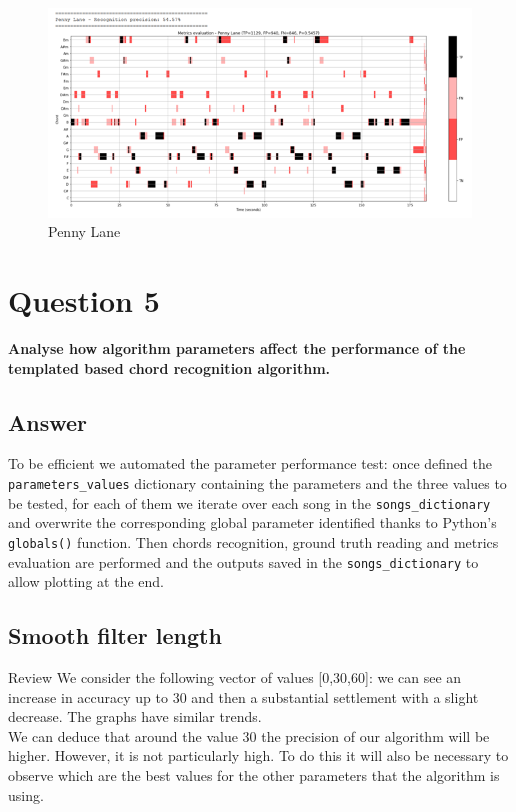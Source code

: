 \documentclass[
	12pt, %
]{fphw}
\begin{document}
{\begin{figure}[H]
 \centering
 \includegraphics[scale=1]{./images/4_penny_lane_metrics.png}
 \caption{Penny Lane}
\end{figure}


\section*{\color{red}Question 5}

\begin{problem}
	\textbf{Analyse how algorithm parameters affect the performance of the templated based chord recognition algorithm.}
\end{problem}

\subsection*{\color{blue}Answer}

To be efficient we automated the parameter performance test: once defined the \verb|parameters_values| dictionary containing the parameters and the three values to be tested, for each of them we iterate over each song in the \verb|songs_dictionary| and overwrite the corresponding global parameter identified thanks to Python's \verb|globals()| function.
Then chords recognition, ground truth reading and metrics evaluation are performed and the outputs saved in the \verb|songs_dictionary| to allow plotting at the end.

\subsection*{Smooth filter length} 
\color{red}Review\color{black}
We consider the following vector of values [0,30,60]: we can see an increase in accuracy up to 30 and then a substantial settlement with a slight decrease. The graphs have similar trends.\\
We can deduce that around the value 30 the precision of our algorithm will be higher. However, it is not particularly high. To do this it will also be necessary to observe which are the best values for the other parameters that the algorithm is using. \\

}
\end{document}
